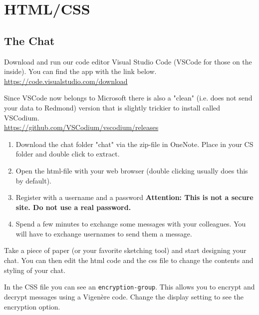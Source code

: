 \documentclass[11pt,a4paper]{report}
\begin{document}
\section{HTML/CSS}




\subsection{The Chat}

\begin{ex}
Download and run our code editor Visual Studio Code (VSCode for those on the inside). You can find the app with the link below. \\
\url{https://code.visualstudio.com/download}

Since VSCode now belongs to Microsoft there is also a "clean" (i.e. does not send your data to Redmond) version that is slightly trickier to install called VSCodium. \\
\url{https://github.com/VSCodium/vscodium/releases}
\end{ex}

\begin{ex}
\begin{enumerate}
\item Download the chat folder "chat" via the zip-file in OneNote. Place in your CS folder and double click to extract.
\item Open the html-file with your web browser (double clicking usually does this by default).
\item Register with a username and a password {\bf Attention: This is not a secure site. Do not use a real password.}
\item Spend a few minutes to exchange some messages with your colleagues. You will have to exchange usernames to  send them a message.
\end{enumerate}

\end{ex}


\begin{ex}
Take a piece of paper (or your favorite sketching tool) and start designing your chat. You can then edit the html code and the css file to change the contents and styling of your chat. 

\end{ex}

\begin{ex}
In the CSS file you can see an \texttt{encryption-group}.  This allows you to encrypt and decrypt messages using a Vigenère code. Change the display setting to see the encryption option.
\end{ex}
\end{document}
